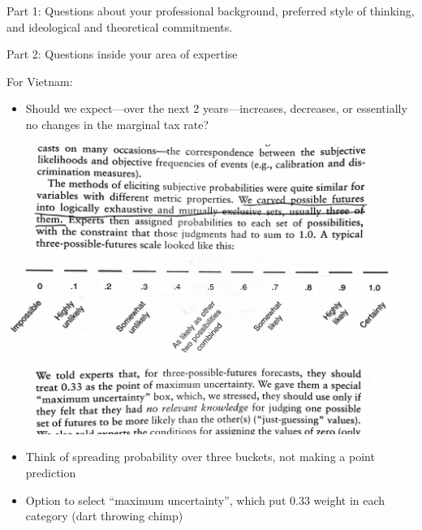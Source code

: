 \documentclass[aspectratio=169]{beamer}
\begin{document}
\begin{frame}

Part 1: Questions about your professional background, preferred style of thinking, and ideological and theoretical commitments.

\end{frame}
\begin{frame}

Part 2: Questions inside your area of expertise

\end{frame}
\begin{frame}

For Vietnam:
\begin{itemize}
\item Should we expect---over the next 2 years---increases, decreases, or essentially no changes in the marginal tax rate?
\end{itemize}

\begin{center}
\includegraphics[width=\textwidth]{figures/tetlock_scale}
\end{center}

\pause

\begin{itemize}
\item Think of spreading probability over three buckets, not making a point prediction
\item Option to select ``maximum uncertainty'', which put 0.33 weight in each category (dart throwing chimp)
\end{itemize}

\end{frame}
\end{document}
